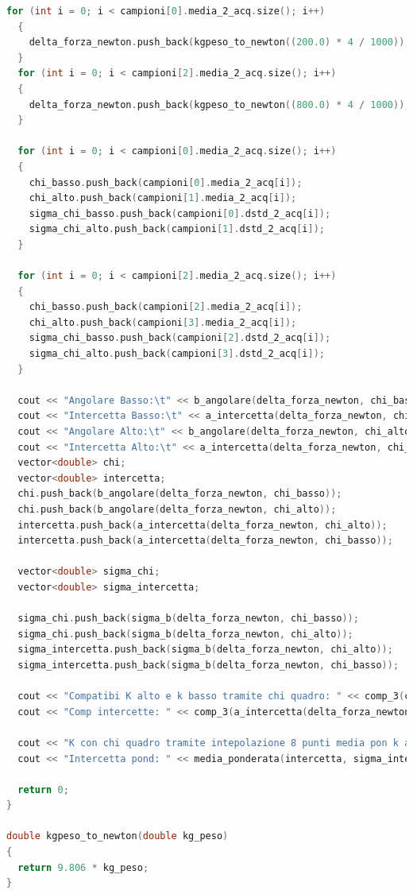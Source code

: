 \documentclass[a4paper,11pt,oneside]{article}
\begin{document}
\begin{lstlisting}[language=C++, label=lst:analisi_2ac, caption=analisi\_2ac]
  for (int i = 0; i < campioni[0].media_2_acq.size(); i++)
  {
    delta_forza_newton.push_back(kgpeso_to_newton((200.0) * 4 / 1000));
  }
  for (int i = 0; i < campioni[2].media_2_acq.size(); i++) 
  {
    delta_forza_newton.push_back(kgpeso_to_newton((800.0) * 4 / 1000));
  }

  for (int i = 0; i < campioni[0].media_2_acq.size(); i++) 
  {
    chi_basso.push_back(campioni[0].media_2_acq[i]);
    chi_alto.push_back(campioni[1].media_2_acq[i]);
    sigma_chi_basso.push_back(campioni[0].dstd_2_acq[i]);
    sigma_chi_alto.push_back(campioni[1].dstd_2_acq[i]);
  }

  for (int i = 0; i < campioni[2].media_2_acq.size(); i++) 
  {
    chi_basso.push_back(campioni[2].media_2_acq[i]);
    chi_alto.push_back(campioni[3].media_2_acq[i]);
    sigma_chi_basso.push_back(campioni[2].dstd_2_acq[i]);
    sigma_chi_alto.push_back(campioni[3].dstd_2_acq[i]);
  }

  cout << "Angolare Basso:\t" << b_angolare(delta_forza_newton, chi_basso) << " +/- " << sigma_b(delta_forza_newton, chi_basso) << endl;
  cout << "Intercetta Basso:\t" << a_intercetta(delta_forza_newton, chi_basso) << " +/- " << sigma_a(delta_forza_newton, chi_basso) << endl;
  cout << "Angolare Alto:\t" << b_angolare(delta_forza_newton, chi_alto) << " +/- " << sigma_b(delta_forza_newton, chi_alto) << endl;
  cout << "Intercetta Alto:\t" << a_intercetta(delta_forza_newton, chi_alto) << " +/- " << sigma_a(delta_forza_newton, chi_alto) << endl;
  vector<double> chi;
  vector<double> intercetta;
  chi.push_back(b_angolare(delta_forza_newton, chi_basso));
  chi.push_back(b_angolare(delta_forza_newton, chi_alto));
  intercetta.push_back(a_intercetta(delta_forza_newton, chi_alto));
  intercetta.push_back(a_intercetta(delta_forza_newton, chi_basso));

  vector<double> sigma_chi;
  vector<double> sigma_intercetta;

  sigma_chi.push_back(sigma_b(delta_forza_newton, chi_basso));
  sigma_chi.push_back(sigma_b(delta_forza_newton, chi_alto));
  sigma_intercetta.push_back(sigma_b(delta_forza_newton, chi_alto));
  sigma_intercetta.push_back(sigma_b(delta_forza_newton, chi_basso));

  cout << "Compatibi K alto e k basso tramite chi quadro: " << comp_3(chi[0], chi[1], sigma_chi[0], sigma_chi[1]) << endl;
  cout << "Comp intercette: " << comp_3(a_intercetta(delta_forza_newton, chi_basso), a_intercetta(delta_forza_newton, chi_alto), sigma_a(delta_forza_newton, chi_basso), sigma_a(delta_forza_newton, chi_alto)) << endl;
  
  cout << "K con chi quadro tramite intepolazione 8 punti media pon k alto e K basso):\t" << media_ponderata(chi, sigma_chi) << " +/- " << errore_media_ponderata(sigma_chi) << endl;
  cout << "Intercetta pond: " << media_ponderata(intercetta, sigma_intercetta) << "+/-" << errore_media_ponderata(sigma_intercetta) << endl;

  return 0;
}

double kgpeso_to_newton(double kg_peso)
{
  return 9.806 * kg_peso;
}
\end{lstlisting}
\end{document}
